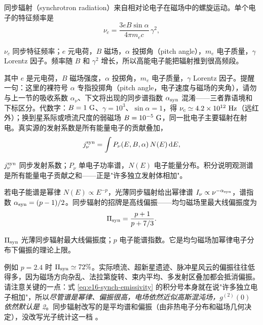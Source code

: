 同步辐射（synchrotron radiation）来自相对论电子在磁场中的螺旋运动。单个电子的特征频率是
\begin{equation}
  \nu_c=\frac{3eB\sin\alpha}{4\pi m_ec}\,\gamma^2 ,
  \label{eq:e16-synch-critical}
\end{equation}
\begin{formulaexplain}
\(\nu_c\) 同步特征频率；\(e\) 元电荷，\(B\) 磁场，\(\alpha\) 投掷角（pitch angle），\(m_e\) 电子质量，\(\gamma\) Lorentz 因子。频率随 \(B\) 和 \(\gamma^2\) 增长，所以高能电子能把辐射推到很高频段。
\end{formulaexplain}
其中 \(e\) 是元电荷，\(B\) 磁场强度，\(\alpha\) 投掷角，\(m_e\) 电子质量，\(\gamma\) Lorentz 因子。提醒一句：这里的裸符号 \(\alpha\) 专指投掷角（pitch angle，电子速度与磁场的夹角），请勿与上一节的吸收系数 \(\alpha_\nu\)、下文将出现的同步谱指数 \(\alpha_{\rm syn}\) 混淆——三者靠语境和下标区分。代数字：\(B=1~{\rm G}\)、\(\gamma=10^3\)、\(\sin\alpha=1\)，得 \(\nu_c\simeq4.2\times10^{12}~{\rm Hz}\)（远红外）；换到星系际或喷流尺度的弱磁场 \(B=10^{-5}~{\rm G}\)，同一批电子主要辐射在射电。真实源的发射系数是所有能量电子的贡献叠加，
\begin{equation}
  j_\nu^{\rm syn}=\int P_\nu(E,B,\alpha)\,N(E)\,{\rm d}E ,
  \label{eq:e16-synch-emissivity}
\end{equation}
\begin{formulaexplain}
\(j_\nu^{\rm syn}\) 同步发射系数；\(P_\nu\) 单电子功率谱，\(N(E)\) 电子能量分布。积分说明观测谱是所有能量电子贡献之和——正是"许多独立发射体相加"。
\end{formulaexplain}
若电子能谱是幂律 \(N(E)\propto E^{-p}\)，光薄同步辐射给出幂律谱 \(I_\nu\propto\nu^{-\alpha_{\rm syn}}\)，谱指数 \(\alpha_{\rm syn}=(p-1)/2\)。同步辐射的招牌是高线偏振——均匀磁场里最大线偏振度为
\begin{equation}
  \Pi_{\rm syn}=\frac{p+1}{p+7/3}.
  \label{eq:e16-synch-polarization}
\end{equation}
\begin{formulaexplain}
\(\Pi_{\rm syn}\) 光薄同步辐射最大线偏振度；\(p\) 电子能谱指数。它是均匀磁场加幂律电子分布下偏振的理论上限。
\end{formulaexplain}
例如 \(p=2.4\) 时 \(\Pi_{\rm syn}\simeq72\%\)。实际喷流、超新星遗迹、脉冲星风云的偏振往往低得多，因为磁场方向杂乱、法拉第旋转、束内平均、多发射区叠加都会抵消偏振。请注意关键的一点：式 \eqref{eq:e16-synch-emissivity} 的积分号本身就在说"许多独立电子相加"，所以\emph{尽管谱是幂律、偏振很高，电场依然近似高斯混沌场，\(g^{(2)}(0)\) 依然默认是 2}。同步辐射改写的是平均谱和偏振（由非热电子分布和磁场几何决定），没改写光子统计这一档 \citep{1965ARA&A...3..297G,1970RvMP...42..237B,1978bllo.conf..328B,2012ApJ...752..157Z}。

